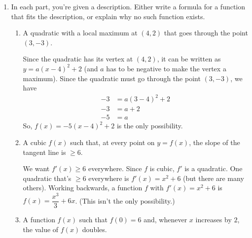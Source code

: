 \documentclass{article}
\newenvironment{noanswer}{}{}
\theoremstyle{theorem}
\begin{document}
\begin{enumerate}
\item \label{fall2018-final-practice3-10}  

  In each part, you're given a description. Either write a formula for a function that fits the description, or explain why no such function exists.

  \begin{enumerate}
  \item
    \begin{problem}[\vfill]
      A quadratic with a local maximum at $(4, 2)$ that goes through the point $(3, -3)$.
    \end{problem}

    \begin{solution}
      Since the quadratic has its vertex at $(4, 2)$, it can be written as $y = a (x - 4)^2 + 2$ (and $a$ has to be negative to make the vertex a maximum). Since the quadratic must go through the point $(3, -3)$, we have
      \begin{align*}
        -3 &= a (3 - 4)^2 + 2 \\
        -3 &= a + 2 \\
        -5 &= a
      \end{align*}
      So, $\boxed{f(x) = -5 (x - 4)^2 + 2}$ is the only possibility. 
    \end{solution}

  \item %

    \begin{problem}[\vfill\newpage]
      A cubic $f(x)$ such that, at every point on $y = f(x)$, the slope of the tangent line is $\geq 6$. 
    \end{problem}

    \begin{solution}
      \begin{noanswer}
        We want $f'(x) \geq 6$ everywhere. Since $f$ is cubic, $f'$ is a quadratic. One quadratic that's $\geq 6$ everywhere is $f'(x) = x^2 + 6$ (but there are many others). Working backwards, a function $f$ with $f'(x) = x^2 + 6$ is $\boxed{f(x) = \dfrac{x^3}{3} + 6x}$. (This isn't the only possibility.) 
      \end{noanswer}
    \end{solution}

  \item \label{fall2018-final-practice3-10-exp}
    \begin{problem}[\vfill]
      A function $f(x)$ such that $f(0) = 6$ and, whenever $x$ increases by $2$, the value of $f(x)$ doubles. 
    \end{problem}


\end{enumerate}
\end{enumerate}
\end{document}
